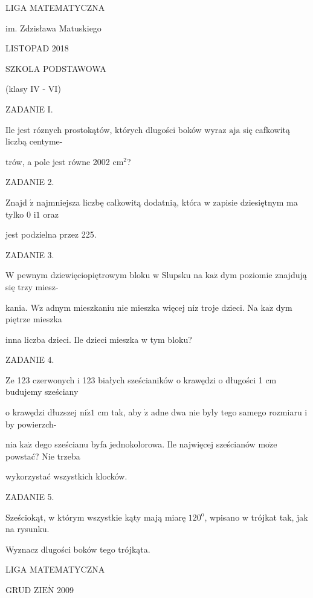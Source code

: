 \documentclass[a4paper,12pt]{article}
\begin{document}
LIGA MATEMATYCZNA

im. Zdzisława Matuskiego

LISTOPAD 2018

SZKOLA PODSTAWOWA

(klasy IV - VI)

ZADANIE I.

Ile jest róznych prostokątów, których dlugości boków wyraz $\mathrm{a}\mathrm{j}\mathrm{a}$ się cafkowitą liczbą centyme-

trów, a pole jest równe 2002 $\mathrm{c}\mathrm{m}^{2}$?

ZADANIE 2.

Znajd $\acute{\mathrm{z}}$ najmniejsza liczbę calkowitą dodatnią, która w zapisie dziesiętnym ma tylko 0 $\mathrm{i}1$ oraz

jest podzielna przez 225.

ZADANIE 3.

$\mathrm{W}$ pewnym dziewięciopiętrowym bloku w Slupsku na $\mathrm{k}\mathrm{a}\dot{\mathrm{z}}$ dym poziomie znajdują się trzy miesz-

kania. $\mathrm{W}\dot{\mathrm{z}}$ adnym mieszkaniu nie mieszka więcej $\mathrm{n}\mathrm{i}\dot{\mathrm{z}}$ troje dzieci. Na $\mathrm{k}\mathrm{a}\dot{\mathrm{z}}$ dym piętrze mieszka

inna liczba dzieci. Ile dzieci mieszka w tym bloku?

ZADANIE 4.

Ze 123 czerwonych i 123 białych sześcianików o krawędzi o długości 1 cm budujemy sześciany

o krawędzi dłuzszej $\mathrm{n}\mathrm{i}\dot{\mathrm{z}}1$ cm tak, aby $\dot{\mathrm{z}}$ adne dwa nie byly tego samego rozmiaru i by powierzch-

nia $\mathrm{k}\mathrm{a}\dot{\mathrm{z}}$ dego sześcianu byfa jednokolorowa. Ile najwięcej sześcianów $\mathrm{m}\mathrm{o}\dot{\mathrm{z}}\mathrm{e}$ powstać? Nie trzeba

wykorzystać wszystkich klocków.

ZADANIE 5.

Sześciokąt, w którym wszystkie kąty mają miarę $120^{\mathrm{o}}$, wpisano w trójkat tak, jak na rysunku.

Wyznacz dlugości boków tego trójkąta.






LIGA MATEMATYCZNA

GRUD Z$\mathrm{I}\mathrm{E}\acute{\mathrm{N}}$ 2009
\end{document}
